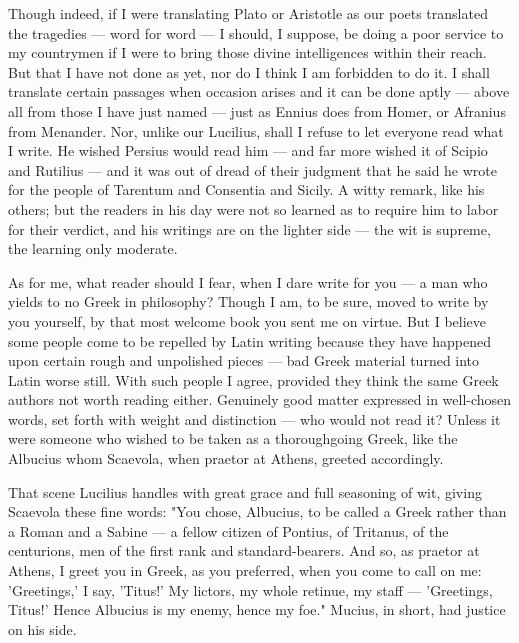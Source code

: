  Though indeed, if I were translating Plato or Aristotle as our poets translated the tragedies — word for word — I should, I suppose, be doing a poor service to my countrymen if I were to bring those divine intelligences within their reach. But that I have not done as yet, nor do I think I am forbidden to do it. I shall translate certain passages when occasion arises and it can be done aptly — above all from those I have just named — just as Ennius does from Homer, or Afranius from Menander. Nor, unlike our Lucilius, shall I refuse to let everyone read what I write. He wished Persius would read him — and far more wished it of Scipio and Rutilius — and it was out of dread of their judgment that he said he wrote for the people of Tarentum and Consentia and Sicily. A witty remark, like his others; but the readers in his day were not so learned as to require him to labor for their verdict, and his writings are on the lighter side — the wit is supreme, the learning only moderate.

 As for me, what reader should I fear, when I dare write for you — a man who yields to no Greek in philosophy? Though I am, to be sure, moved to write by you yourself, by that most welcome book you sent me on virtue. But I believe some people come to be repelled by Latin writing because they have happened upon certain rough and unpolished pieces — bad Greek material turned into Latin worse still. With such people I agree, provided they think the same Greek authors not worth reading either. Genuinely good matter expressed in well-chosen words, set forth with weight and distinction — who would not read it? Unless it were someone who wished to be taken as a thoroughgoing Greek, like the Albucius whom Scaevola, when praetor at Athens, greeted accordingly.

 That scene Lucilius handles with great grace and full seasoning of wit, giving Scaevola these fine words: "You chose, Albucius, to be called a Greek rather than a Roman and a Sabine — a fellow citizen of Pontius, of Tritanus, of the centurions, men of the first rank and standard-bearers. And so, as praetor at Athens, I greet you in Greek, as you preferred, when you come to call on me: 'Greetings,' I say, 'Titus!' My lictors, my whole retinue, my staff — 'Greetings, Titus!' Hence Albucius is my enemy, hence my foe." Mucius, in short, had justice on his side.


